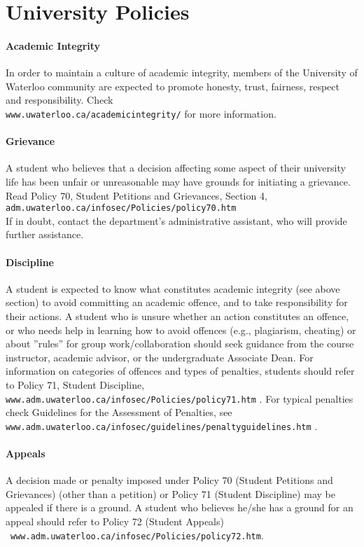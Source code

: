 \section*{University Policies}

\paragraph{Academic Integrity}
In order to maintain a culture of academic integrity, members of the University of Waterloo community are expected to promote honesty, trust, fairness, respect and responsibility. Check\\
\texttt{www.uwaterloo.ca/academicintegrity/} for more information.

\paragraph{Grievance}
A student who believes that a decision affecting some aspect of their university life has been unfair or unreasonable may have grounds for initiating a grievance. Read Policy 70, Student Petitions and Grievances, Section 4, \texttt{adm.uwaterloo.ca/infosec/Policies/policy70.htm} \\
If in doubt, contact the department's administrative assistant, who will provide further assistance.

\paragraph{Discipline}
A student is expected to know what constitutes academic integrity (see above section) to avoid committing an academic offence, and to take responsibility for their actions. A student who is unsure whether an action constitutes an offence, or who needs help in learning how to avoid offences (e.g., plagiarism, cheating) or about ''rules'' for group work/collaboration should seek guidance from the course instructor, academic advisor, or the undergraduate Associate Dean. For information on categories of offences and types of penalties, students should refer to Policy 71, Student Discipline, \texttt{www.adm.uwaterloo.ca/infosec/Policies/policy71.htm} . For typical penalties check Guidelines for the Assessment of Penalties, see \\\texttt{www.adm.uwaterloo.ca/infosec/guidelines/penaltyguidelines.htm} .

\paragraph{Appeals}
A decision made or penalty imposed under Policy 70 (Student Petitions and Grievances) (other than a petition) or Policy 71 (Student Discipline) may be appealed if there is a ground. A student who believes he/she has a ground for an appeal should refer to Policy 72 (Student Appeals)\\~\texttt{www.adm.uwaterloo.ca/infosec/Policies/policy72.htm}.

